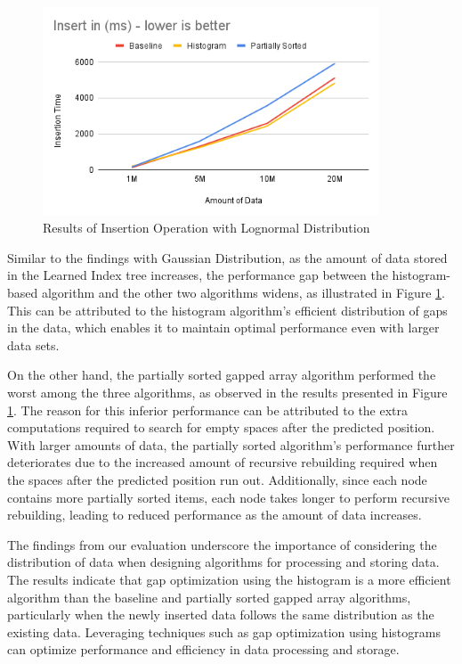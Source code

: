 \documentclass[11pt,a4paper]{article}
\newcommand{\learnindex}{\textsf{Learned Index}\xspace}
\begin{document}
\begin{figure}
    \centering
    \includegraphics[width=100mm,scale=1]{Figures/InsertionResultLognormal.png}
    \caption{
     Results of Insertion Operation with Lognormal Distribution 
    }
    \label{fig:GraphInsertionResultLognormal}
\end{figure}
Similar to the findings with Gaussian Distribution, as the amount of data stored in the \learnindex tree increases, the performance gap between the histogram-based algorithm and the other two algorithms widens, as illustrated in Figure \ref{fig:GraphInsertionResultLognormal}. This can be attributed to the histogram algorithm's efficient distribution of gaps in the data, which enables it to maintain optimal performance even with larger data sets.

On the other hand, the partially sorted gapped array algorithm performed the worst among the three algorithms, as observed in the results presented in Figure \ref{fig:GraphInsertionResultLognormal}. The reason for this inferior performance can be attributed to the extra computations required to search for empty spaces after the predicted position. With larger amounts of data, the partially sorted algorithm's performance further deteriorates due to the increased amount of recursive rebuilding required when the spaces after the predicted position run out. Additionally, since each node contains more partially sorted items, each node takes longer to perform recursive rebuilding, leading to reduced performance as the amount of data increases.

The findings from our evaluation underscore the importance of considering the distribution of data when designing algorithms for processing and storing data. The results indicate that gap optimization using the histogram is a more efficient algorithm than the baseline and partially sorted gapped array algorithms, particularly when the newly inserted data follows the same distribution as the existing data. Leveraging techniques such as gap optimization using histograms can optimize performance and efficiency in data processing and storage.
\end{document}
